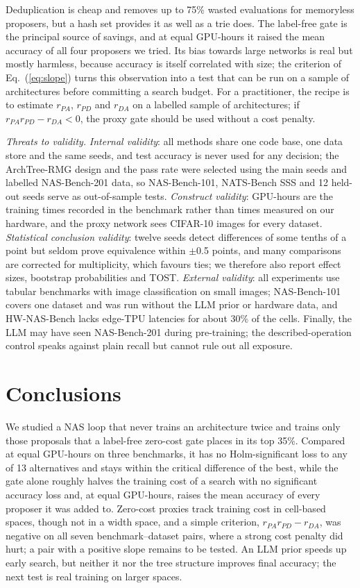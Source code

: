 \documentclass{sadhana}
\newcommand{\rmg}{ArchTree-RMG}
\begin{document}
Deduplication is cheap and removes up to 75\% wasted evaluations for memoryless proposers, but a hash set provides it as well as a trie does. The label-free gate is the principal source of savings, and at equal GPU-hours it raised the mean accuracy of all four proposers we tried. Its bias towards large networks is real but mostly harmless, because accuracy is itself correlated with size; the criterion of Eq.~(\ref{eq:slope}) turns this observation into a test that can be run on a sample of architectures before committing a search budget. For a practitioner, the recipe is to estimate $r_{PA}$, $r_{PD}$ and $r_{DA}$ on a labelled sample of architectures; if $r_{PA}r_{PD}-r_{DA}<0$, the proxy gate should be used without a cost penalty.

\textit{Threats to validity.} \emph{Internal validity}: all methods share one code base, one data store and the same seeds, and test accuracy is never used for any decision; the \rmg{} design and the pass rate were selected using the main seeds and labelled NAS-Bench-201 data, so NAS-Bench-101, NATS-Bench SSS and 12 held-out seeds serve as out-of-sample tests. \emph{Construct validity}: GPU-hours are the training times recorded in the benchmark rather than times measured on our hardware, and the proxy network sees CIFAR-10 images for every dataset. \emph{Statistical conclusion validity}: twelve seeds detect differences of some tenths of a point but seldom prove equivalence within $\pm$0.5 points, and many comparisons are corrected for multiplicity, which favours ties; we therefore also report effect sizes, bootstrap probabilities and TOST. \emph{External validity}: all experiments use tabular benchmarks with image classification on small images; NAS-Bench-101 covers one dataset and was run without the LLM prior or hardware data, and HW-NAS-Bench lacks edge-TPU latencies for about 30\% of the cells. Finally, the LLM may have seen NAS-Bench-201 during pre-training; the described-operation control speaks against plain recall but cannot rule out all exposure.

\section{Conclusions}\label{sec:conclusions}

We studied a NAS loop that never trains an architecture twice and trains only those proposals that a label-free zero-cost gate places in its top 35\%. Compared at equal GPU-hours on three benchmarks, it has no Holm-significant loss to any of 13 alternatives and stays within the critical difference of the best, while the gate alone roughly halves the training cost of a search with no significant accuracy loss and, at equal GPU-hours, raises the mean accuracy of every proposer it was added to. Zero-cost proxies track training cost in cell-based spaces, though not in a width space, and a simple criterion, $r_{PA}r_{PD}-r_{DA}$, was negative on all seven benchmark--dataset pairs, where a strong cost penalty did hurt; a pair with a positive slope remains to be tested. An LLM prior speeds up early search, but neither it nor the tree structure improves final accuracy; the next test is real training on larger spaces.
\end{document}
